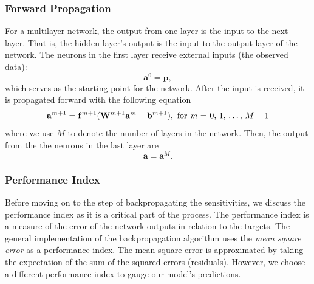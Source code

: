 \documentclass[12pt,halfline,a4paper]{ouparticle}
\begin{document}
\subsubsection{Forward Propagation}
\label{sec4.2.1}
For a multilayer network, the output from one layer is the input to the next layer. That is, the hidden layer's output is the input to the output layer of the network. The neurons in the first layer receive external inputs (the observed data):
\begin{equation}
\mathbf{a}^{0} = \mathbf{p},
\end{equation}
which serves as the starting point for the network. After the input is received, it is propagated forward with the following equation
\begin{equation}
\mathbf{a}^{m+1} = \mathbf{f}^{m+1}(\mathbf{W}^{m+1}\mathbf{a}^{m} + \mathbf{b}^{m+1}), \text{ for \emph{m} = 0, 1, \ldots, $M - 1$} 
\end{equation}
where we use $M$ to denote the number of layers in the network. Then, the output from the the neurons in the last layer are
\begin{equation}
\mathbf{a} = \mathbf{a}^{M}.
\end{equation}

\subsubsection{Performance Index}
\label{sec4.2.2}
Before moving on to the step of backpropagating the sensitivities, we discuss the performance index as it is a critical part of the process. The performance index is a measure of the error of the network outputs in relation to the targets. The general implementation of the backpropagation algorithm uses the \emph{mean square error} as a performance index. The mean square error is approximated by taking the expectation of the sum of the squared errors (residuals). However, we choose a different performance index to gauge our model's predictions. 
\end{document}
